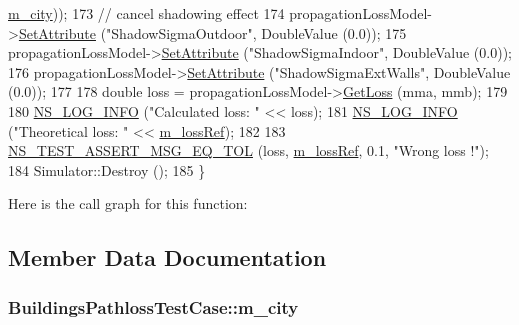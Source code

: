 \begin{DoxyCode}
      \hyperlink{classBuildingsPathlossTestCase_a7ad7c5b7a21683b8634de9509743150b}{m\_city}));
173   \textcolor{comment}{// cancel shadowing effect}
174   propagationLossModel->\hyperlink{classns3_1_1ObjectBase_ac60245d3ea4123bbc9b1d391f1f6592f}{SetAttribute} (\textcolor{stringliteral}{"ShadowSigmaOutdoor"}, DoubleValue (0.0));
175   propagationLossModel->\hyperlink{classns3_1_1ObjectBase_ac60245d3ea4123bbc9b1d391f1f6592f}{SetAttribute} (\textcolor{stringliteral}{"ShadowSigmaIndoor"}, DoubleValue (0.0));
176   propagationLossModel->\hyperlink{classns3_1_1ObjectBase_ac60245d3ea4123bbc9b1d391f1f6592f}{SetAttribute} (\textcolor{stringliteral}{"ShadowSigmaExtWalls"}, DoubleValue (0.0));
177 
178   \textcolor{keywordtype}{double} loss = propagationLossModel->\hyperlink{classns3_1_1HybridBuildingsPropagationLossModel_a241f98b865eb28321e724c6963ba4f83}{GetLoss} (mma, mmb);
179 
180   \hyperlink{group__logging_gafbd73ee2cf9f26b319f49086d8e860fb}{NS\_LOG\_INFO} (\textcolor{stringliteral}{"Calculated loss: "} << loss);
181   \hyperlink{group__logging_gafbd73ee2cf9f26b319f49086d8e860fb}{NS\_LOG\_INFO} (\textcolor{stringliteral}{"Theoretical loss: "} << \hyperlink{classBuildingsPathlossTestCase_a4cde89661f690fa19bff2259ca7328bf}{m\_lossRef});
182  
183   \hyperlink{group__testing_ga9e7861b56b4e70db3b56044cb7a28e41}{NS\_TEST\_ASSERT\_MSG\_EQ\_TOL} (loss, \hyperlink{classBuildingsPathlossTestCase_a4cde89661f690fa19bff2259ca7328bf}{m\_lossRef}, 0.1, \textcolor{stringliteral}{"Wrong loss !"});
184   Simulator::Destroy ();
185 \}
\end{DoxyCode}


Here is the call graph for this function\+:




\subsection{Member Data Documentation}
\subsubsection[{\texorpdfstring{m\+\_\+city}{m_city}}]{ Buildings\+Pathloss\+Test\+Case\+::m\+\_\+city\hspace{0.3cm}{\ttfamily [private]}}\hypertarget{classBuildingsPathlossTestCase_a7ad7c5b7a21683b8634de9509743150b}{}\label{classBuildingsPathlossTestCase_a7ad7c5b7a21683b8634de9509743150b}
